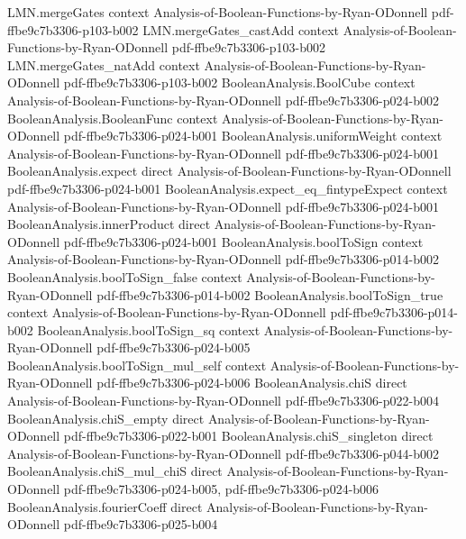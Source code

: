 \begin{lemma}
\proofstep
  {LMN.mergeGates}
  {context}
  {Analysis-of-Boolean-Functions-by-Ryan-ODonnell}
  {pdf-ffbe9c7b3306-p103-b002}
\proofstep
  {LMN.mergeGates_castAdd}
  {context}
  {Analysis-of-Boolean-Functions-by-Ryan-ODonnell}
  {pdf-ffbe9c7b3306-p103-b002}
\proofstep
  {LMN.mergeGates_natAdd}
  {context}
  {Analysis-of-Boolean-Functions-by-Ryan-ODonnell}
  {pdf-ffbe9c7b3306-p103-b002}
\proofstep
  {BooleanAnalysis.BoolCube}
  {context}
  {Analysis-of-Boolean-Functions-by-Ryan-ODonnell}
  {pdf-ffbe9c7b3306-p024-b002}
\proofstep
  {BooleanAnalysis.BooleanFunc}
  {context}
  {Analysis-of-Boolean-Functions-by-Ryan-ODonnell}
  {pdf-ffbe9c7b3306-p024-b001}
\proofstep
  {BooleanAnalysis.uniformWeight}
  {context}
  {Analysis-of-Boolean-Functions-by-Ryan-ODonnell}
  {pdf-ffbe9c7b3306-p024-b001}
\proofstep
  {BooleanAnalysis.expect}
  {direct}
  {Analysis-of-Boolean-Functions-by-Ryan-ODonnell}
  {pdf-ffbe9c7b3306-p024-b001}
\proofstep
  {BooleanAnalysis.expect_eq_fintypeExpect}
  {context}
  {Analysis-of-Boolean-Functions-by-Ryan-ODonnell}
  {pdf-ffbe9c7b3306-p024-b001}
\proofstep
  {BooleanAnalysis.innerProduct}
  {direct}
  {Analysis-of-Boolean-Functions-by-Ryan-ODonnell}
  {pdf-ffbe9c7b3306-p024-b001}
\proofstep
  {BooleanAnalysis.boolToSign}
  {context}
  {Analysis-of-Boolean-Functions-by-Ryan-ODonnell}
  {pdf-ffbe9c7b3306-p014-b002}
\proofstep
  {BooleanAnalysis.boolToSign_false}
  {context}
  {Analysis-of-Boolean-Functions-by-Ryan-ODonnell}
  {pdf-ffbe9c7b3306-p014-b002}
\proofstep
  {BooleanAnalysis.boolToSign_true}
  {context}
  {Analysis-of-Boolean-Functions-by-Ryan-ODonnell}
  {pdf-ffbe9c7b3306-p014-b002}
\proofstep
  {BooleanAnalysis.boolToSign_sq}
  {context}
  {Analysis-of-Boolean-Functions-by-Ryan-ODonnell}
  {pdf-ffbe9c7b3306-p024-b005}
\proofstep
  {BooleanAnalysis.boolToSign_mul_self}
  {context}
  {Analysis-of-Boolean-Functions-by-Ryan-ODonnell}
  {pdf-ffbe9c7b3306-p024-b006}
\proofstep
  {BooleanAnalysis.chiS}
  {direct}
  {Analysis-of-Boolean-Functions-by-Ryan-ODonnell}
  {pdf-ffbe9c7b3306-p022-b004}
\proofstep
  {BooleanAnalysis.chiS_empty}
  {direct}
  {Analysis-of-Boolean-Functions-by-Ryan-ODonnell}
  {pdf-ffbe9c7b3306-p022-b001}
\proofstep
  {BooleanAnalysis.chiS_singleton}
  {direct}
  {Analysis-of-Boolean-Functions-by-Ryan-ODonnell}
  {pdf-ffbe9c7b3306-p044-b002}
\proofstep
  {BooleanAnalysis.chiS_mul_chiS}
  {direct}
  {Analysis-of-Boolean-Functions-by-Ryan-ODonnell}
  {pdf-ffbe9c7b3306-p024-b005,
    pdf-ffbe9c7b3306-p024-b006}
\proofstep
  {BooleanAnalysis.fourierCoeff}
  {direct}
  {Analysis-of-Boolean-Functions-by-Ryan-ODonnell}
  {pdf-ffbe9c7b3306-p025-b004}

\end{lemma}

